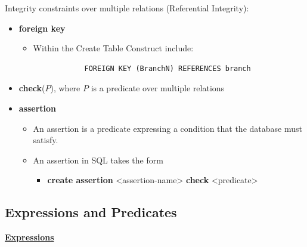 Integrity constraints over multiple relations (Referential Integrity):
\begin{itemize}[label=\(\rhd\)]
    \item \textbf{foreign key}
    \begin{itemize}[label=\(\rhd\)]
        \item Within the Create Table Construct include:
        \begin{lstlisting}
            FOREIGN KEY (BranchN) REFERENCES branch
        \end{lstlisting}
    \end{itemize}
    \item \textbf{check}($P$), where $P$ is a predicate over multiple relations
    \item \textbf{assertion}
    \begin{itemize}[label=\(\rhd\)]
        \item An assertion is a predicate expressing a condition that the database must satisfy.
        \item An assertion in SQL takes the form
        \begin{itemize}[label=\(\rhd\)]
            \item[] \textbf{create assertion} <assertion-name> \textbf{check} <predicate>
        \end{itemize}
    \end{itemize}
\end{itemize}
\subsection{Expressions and Predicates}
\textbf{\underline{Expressions}}
\bigskip

